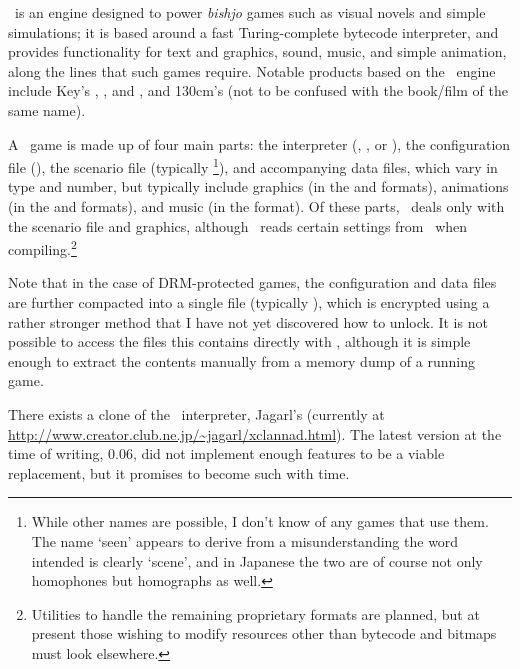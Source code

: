 

  \reallive\ is an engine designed to power \textit{bish\omac jo} games such as
  visual novels and simple simulations; it is based around a fast
  Turing-complete bytecode interpreter, and provides functionality for text and
  graphics, sound, music, and simple animation, along the lines that such games
  require.  Notable products based on the \reallive\ engine include Key's
  , , and , and
  130cm's  (not to be confused with the book/film of the 
  same name).

   A \reallive\ game is made up of four main parts:
  the interpreter (, , or
  ), the configuration file (\gameexe), the scenario
  file (typically \footnote{While other names are possible, I
  don't know of any games that use them.  The name `seen' appears to derive from
  a misunderstanding\,\textemdash\,the word intended is clearly `scene', and in
  Japanese the two are of course not only homophones but homographs as well.}),
  and accompanying data files, which vary in type and number, but typically
  include graphics (in the  and  formats), animations (in
  the  and  formats), and music (in the  format).
  Of these parts, \package\ deals only with the scenario file and graphics,
  although \compiler\ reads certain settings from \gameexe\ when
  compiling.\footnote{Utilities to handle the remaining proprietary formats are
  planned, but at present those wishing to modify resources other than bytecode
  and bitmaps must look elsewhere.}

  Note that in the case of DRM-protected games, the configuration and data files
  are further compacted into a single file (typically ),
  which is encrypted using a rather stronger method that I have not yet
  discovered how to unlock.  It is not possible to access the files this
  contains directly with \package, although it is simple enough to extract the
  contents manually from a memory dump of a running game.

  There exists a clone of the \reallive\ interpreter, Jagarl's  
  (currently at \mbox{\url{http://www.creator.club.ne.jp/~jagarl/xclannad.html}}).
  The latest version at the time of writing, 0.06, did not implement enough 
  features to be a viable replacement, but it promises to become such with 
  time.

